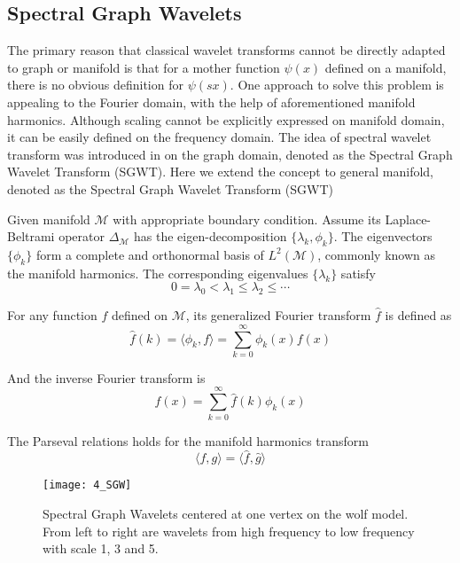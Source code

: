 \subsection*{Spectral Graph Wavelets}

The primary reason that classical wavelet transforms cannot be directly adapted to graph or manifold is
that for a mother function $\psi(x)$ defined on a manifold,
there is no obvious definition for $\psi(sx)$. One approach to solve this problem is appealing to the Fourier domain,
with the help of aforementioned manifold harmonics. Although scaling cannot be explicitly expressed on manifold domain,
it can be easily defined on the frequency domain. The idea of spectral wavelet transform was introduced in \cite{Hammond2011}
on the graph domain, denoted as the Spectral Graph Wavelet Transform (SGWT). Here we extend the concept to general manifold,
denoted as the Spectral Graph Wavelet Transform (SGWT)

Given manifold $\mathcal{M}$ with appropriate boundary condition. Assume its Laplace-Beltrami operator $\Delta_\mathcal{M}$ has the eigen-decomposition $\{\lambda_k,\phi_k\}$. The eigenvectors $\{\phi_k\}$ form a complete and orthonormal basis of $L^2(\mathcal{M})$, commonly known as the manifold harmonics. The corresponding eigenvalues $\{\lambda_k\}$ satisfy
\begin{equation}
0=\lambda_0 < \lambda_1 \leq \lambda_2 \leq \cdots
\end{equation}

For any function $f$ defined on $\mathcal{M}$, its generalized Fourier transform $\hat{f}$ is defined as
\begin{equation}
\hat{f}(k)=\langle \phi_k, f \rangle=\sum_{k=0}^\infty \phi_k(x)f(x)
\end{equation}

And the inverse Fourier transform is
\begin{equation}
f(x)=\sum_{k=0}^\infty\hat{f}(k)\phi_k(x)
\end{equation}

The Parseval relations holds for the manifold harmonics transform
\begin{equation}
\label{eq:parseval}
\langle f,g\rangle=\langle\hat{f},\hat{g}\rangle
\end{equation}

\begin{figure}[!to]
\begin{center}
\texttt{[image: 4\_SGW]}
\end{center}
\caption[Spectral graph wavelets on the wolf model.]{Spectral Graph Wavelets centered at one vertex on the wolf model.
  From left to right are wavelets from high frequency to low frequency with
  scale 1, 3 and 5.}
\label{SGW}
\end{figure}

